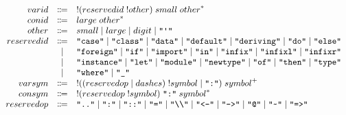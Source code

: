 \begin{align*}
\begin{array}{rcl}
    {varid}
    & \Coloneq & ! ({reservedid}\; !{other})\; {small}\; {other}^*
    \\
    {conid}
    & \Coloneq & {large}\; {other}^*
    \\
    {other}
    & \Coloneq & {small}
    \mid {large}
    \mid {digit}
    \mid \text{\texttt{\textquotedbl\textquotesingle\textquotedbl}}
    \\
    {reservedid}
    & \Coloneq & \text{\texttt{\textquotedbl case\textquotedbl}}
    \mid \text{\texttt{\textquotedbl class\textquotedbl}}
    \mid \text{\texttt{\textquotedbl data\textquotedbl}}
    \mid \text{\texttt{\textquotedbl default\textquotedbl}}
    \mid \text{\texttt{\textquotedbl deriving\textquotedbl}}
    \mid \text{\texttt{\textquotedbl do\textquotedbl}}
    \mid \text{\texttt{\textquotedbl else\textquotedbl}}
    \\
    & \mid & \text{\texttt{\textquotedbl foreign\textquotedbl}}
    \mid \text{\texttt{\textquotedbl if\textquotedbl}}
    \mid \text{\texttt{\textquotedbl import\textquotedbl}}
    \mid \text{\texttt{\textquotedbl in\textquotedbl}}
    \mid \text{\texttt{\textquotedbl infix\textquotedbl}}
    \mid \text{\texttt{\textquotedbl infixl\textquotedbl}}
    \mid \text{\texttt{\textquotedbl infixr\textquotedbl}}
    \\
    & \mid & \text{\texttt{\textquotedbl instance\textquotedbl}}
    \mid \text{\texttt{\textquotedbl let\textquotedbl}}
    \mid \text{\texttt{\textquotedbl module\textquotedbl}}
    \mid \text{\texttt{\textquotedbl newtype\textquotedbl}}
    \mid \text{\texttt{\textquotedbl of\textquotedbl}}
    \mid \text{\texttt{\textquotedbl then\textquotedbl}}
    \mid \text{\texttt{\textquotedbl type\textquotedbl}}
    \\
    & \mid & \text{\texttt{\textquotedbl where\textquotedbl}}
    \mid \text{\texttt{\textquotedbl\textunderscore\textquotedbl}}
    \\
    {varsym}
    & \Coloneq & {!} (({reservedop} \mid {dashes})\; !{symbol} \mid \text{\texttt{\textquotedbl :\textquotedbl}})\; {symbol}^+
    \\
    {consym}
    & \Coloneq & {!} ({reservedop}\; !{symbol})\; \text{\texttt{\textquotedbl :\textquotedbl}}\; {symbol}^*
    \\
    {reservedop}
    & \Coloneq & \text{\texttt{\textquotedbl ..\textquotedbl}}
    \mid \text{\texttt{\textquotedbl :\textquotedbl}}
    \mid \text{\texttt{\textquotedbl ::\textquotedbl}}
    \mid \text{\texttt{\textquotedbl =\textquotedbl}}
    \mid \text{\texttt{\textquotedbl \textbackslash\textbackslash\textquotedbl}}
    \mid \text{\texttt{\textquotedbl <-\textquotedbl}}
    \mid \text{\texttt{\textquotedbl ->\textquotedbl}}
    \mid \text{\texttt{\textquotedbl @\textquotedbl}}
    \mid \text{\texttt{\textquotedbl \textasciitilde\textquotedbl}}
    \mid \text{\texttt{\textquotedbl =>\textquotedbl}}
  \end{array}
\end{align*}

